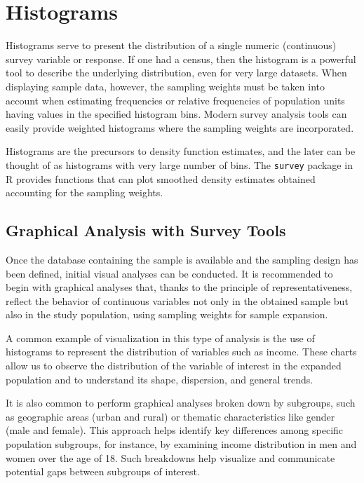 \documentclass[
  12pt,
]{book}
\begin{document}
\section{Histograms}\label{histograms}

Histograms serve to present the distribution of a single numeric (continuous) survey variable or response. If one had a census, then the histogram is a powerful tool to describe the underlying distribution, even for very large datasets. When displaying sample data, however, the sampling weights must be taken into account when estimating frequencies or relative frequencies of population units having values in the specified histogram bins. Modern survey analysis tools can easily provide weighted histograms where the sampling weights are incorporated.

Histograms are the precursors to density function estimates, and the later can be thought of as histograms with very large number of bins. The \texttt{survey} package in R provides functions that can plot smoothed density estimates obtained accounting for the sampling weights.

\subsection{Graphical Analysis with Survey Tools}\label{graphical-analysis-with-survey-tools}

Once the database containing the sample is available and the sampling design has been defined, initial visual analyses can be conducted. It is recommended to begin with graphical analyses that, thanks to the principle of representativeness, reflect the behavior of continuous variables not only in the obtained sample but also in the study population, using sampling weights for sample expansion.

A common example of visualization in this type of analysis is the use of histograms to represent the distribution of variables such as income. These charts allow us to observe the distribution of the variable of interest in the expanded population and to understand its shape, dispersion, and general trends.

It is also common to perform graphical analyses broken down by subgroups, such as geographic areas (urban and rural) or thematic characteristics like gender (male and female). This approach helps identify key differences among specific population subgroups, for instance, by examining income distribution in men and women over the age of 18. Such breakdowns help visualize and communicate potential gaps between subgroups of interest.
\end{document}
